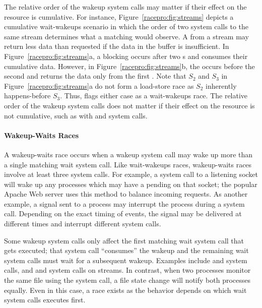 The relative order of the wakeup system calls may matter if their
effect on the resource is cumulative. For instance,
Figure~\ref{racepro:fig:streams} depicts a cumulative wait-wakeups scenario
in which the order of two  system calls to the same stream
determines what a matching  would observe.  
A  from a stream may return less data than requested if the
data in the buffer is insufficient. 
In Figure~\ref{racepro:fig:streams}a, a blocking  occurs after two 
s and consumes their cumulative data.  However, in
Figure~\ref{racepro:fig:streams}b, the  occurs before the second
 and returns the data only from the first . 
Note that $S_2$ and $S_3$ in Figure~\ref{racepro:fig:streams}a do not form a
load-store race as $S_2$ inherently happens-before $S_3$.
Thus, \racepro flags either case as a wait-wakeups race.
The relative order of the wakeup system calls does not matter if their
effect on the resource is not cumulative, such as with  and
 system calls.

\paragraph{Wakeup-Waits Races} \label{racepro:sec:wakeup-wait}

A wakeup-waits race occurs when a wakeup system call may wake up
more than a single matching wait system call.
Like wait-wakeups races, wakeup-waits races
involve at least three system calls. For example, a  system
call to a listening socket will wake up any processes which may have a
pending  on that socket; the popular Apache Web server uses
this method to balance incoming requests.  As another example, a
signal sent to a process may interrupt the process during a system
call. Depending on the exact timing of events, the signal may be
delivered at different times and interrupt different system calls.

Some wakeup system calls only affect the first matching wait system
call that gets executed; that system call ``consumes'' the wakeup and
the remaining wait system calls must wait for a subsequent wakeup.
Examples include  and  system calls, and 
and  system calls on streams. In contrast, when two processes 
monitor the same file using the  system call, a file state
change will notify both processes equally. Even in this case, a race
exists as the behavior depends on which wait system calls executes
first.

